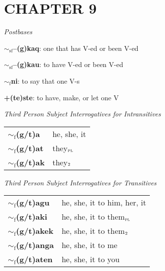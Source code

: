 \documentclass{article}
\begin{document}
\section{CHAPTER 9}

\textit{Postbases}
\begin{description}
\item \textbf{$\sim_\text{sf}$--(g)kaq}: one that has V-ed or been V-ed
\item \textbf{$\sim_\text{sf}$--(g)kau}: to have V-ed or been V-ed
\item \textbf{$\sim_\text{f}$ni}: to say that one V-s
\item \textbf{+(te)ste}: to have, make, or let one V
\end{description}

\bigskip

\textit{Third Person Subject Interrogatives for Intransitives}

\begin{tabular}{ l l }
\textbf{$\sim_\text{f}$(g/t)a} & he, she, it\\
\textbf{$\sim_\text{f}$(g/t)at} & they$_\text{\textsc{pl}}$ \\
\textbf{$\sim_\text{f}$(g/t)ak} & they$_\text{\textsc{2}}$ \\
\end{tabular}

\bigskip

\textit{Third Person Subject Interrogatives for Transitives}

\begin{tabular}{ l l }
\textbf{$\sim_\text{f}$(g/t)agu} & he, she, it to him, her, it\\
\textbf{$\sim_\text{f}$(g/t)aki} & he, she, it to them$_\text{\textsc{pl}}$ \\
\textbf{$\sim_\text{f}$(g/t)akek} & he, she, it to them$_\text{\textsc{2}}$ \\
\textbf{$\sim_\text{f}$(g/t)anga} & he, she, it to me \\
\textbf{$\sim_\text{f}$(g/t)aten} & he, she, it to you
\end{tabular}

\end{document}

